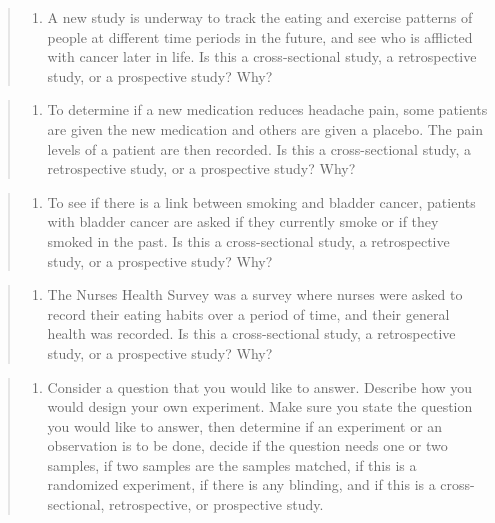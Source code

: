 \documentclass[]{book}
\providecommand{\tightlist}{%
  \setlength{\itemsep}{0pt}\setlength{\parskip}{0pt}}
\begin{document}
\begin{quote}
\begin{enumerate}
\def\labelenumi{\arabic{enumi}.}
\setcounter{enumi}{16}
\tightlist
\item
  A new study is underway to track the eating and exercise patterns of people at different time periods in the future, and see who is afflicted with cancer later in life. Is this a cross-sectional study, a retrospective study, or a prospective study? Why?
\end{enumerate}
\end{quote}

\begin{quote}
\begin{enumerate}
\def\labelenumi{\arabic{enumi}.}
\setcounter{enumi}{17}
\tightlist
\item
  To determine if a new medication reduces headache pain, some patients are given the new medication and others are given a placebo. The pain levels of a patient are then recorded. Is this a cross-sectional study, a retrospective study, or a prospective study? Why?
\end{enumerate}
\end{quote}

\begin{quote}
\begin{enumerate}
\def\labelenumi{\arabic{enumi}.}
\setcounter{enumi}{18}
\tightlist
\item
  To see if there is a link between smoking and bladder cancer, patients with bladder cancer are asked if they currently smoke or if they smoked in the past. Is this a cross-sectional study, a retrospective study, or a prospective study? Why?
\end{enumerate}
\end{quote}

\begin{quote}
\begin{enumerate}
\def\labelenumi{\arabic{enumi}.}
\setcounter{enumi}{19}
\tightlist
\item
  The Nurses Health Survey was a survey where nurses were asked to record their eating habits over a period of time, and their general health was recorded. Is this a cross-sectional study, a retrospective study, or a prospective study? Why?
\end{enumerate}
\end{quote}

\begin{quote}
\begin{enumerate}
\def\labelenumi{\arabic{enumi}.}
\setcounter{enumi}{20}
\tightlist
\item
  Consider a question that you would like to answer. Describe how you would design your own experiment. Make sure you state the question you would like to answer, then determine if an experiment or an observation is to be done, decide if the question needs one or two samples, if two samples are the samples matched, if this is a randomized experiment, if there is any blinding, and if this is a cross-sectional, retrospective, or prospective study.
  \textbf{\\
  }
\end{enumerate}
\end{quote}
\end{document}
